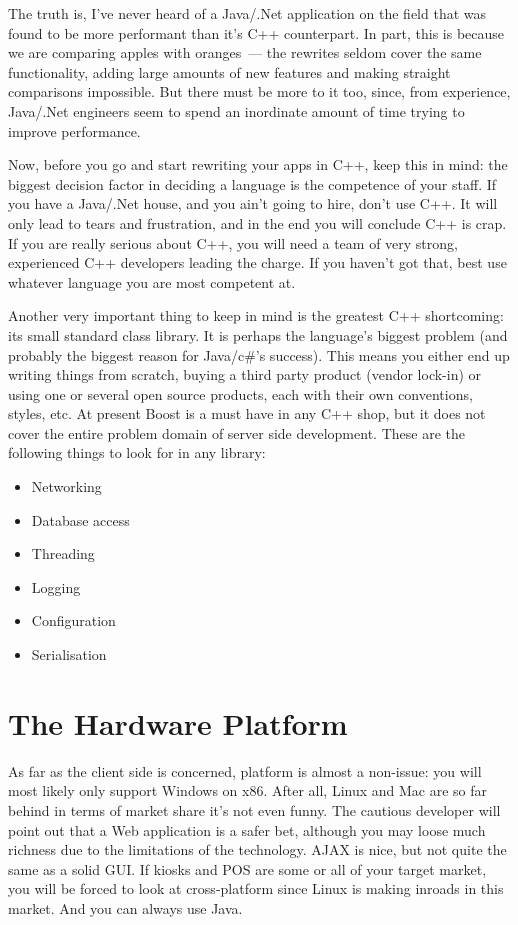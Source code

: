 \documentclass{memoir}
\begin{document}
The truth is, I've never heard of a Java/.Net application on the field
that was found to be more performant than it's C++ counterpart. In
part, this is because we are comparing apples with oranges~--- the
rewrites seldom cover the same functionality, adding large amounts of
new features and making straight comparisons impossible. But there
must be more to it too, since, from experience, Java/.Net engineers
seem to spend an inordinate amount of time trying to improve
performance.

Now, before you go and start rewriting your apps in C++, keep this in
mind: the biggest decision factor in deciding a language is the
competence of your staff. If you have a Java/.Net house, and you ain't
going to hire, don't use C++. It will only lead to tears and
frustration, and in the end you will conclude C++ is crap. If you are
really serious about C++, you will need a team of very strong,
experienced C++ developers leading the charge. If you haven't got
that, best use whatever language you are most competent at.

Another very important thing to keep in mind is the greatest C++
shortcoming: its small standard class library. It is perhaps the
language's biggest problem (and probably the biggest reason for
Java/c\#'s success). This means you either end up writing things from
scratch, buying a third party product (vendor lock-in) or using one or
several open source products, each with their own conventions, styles,
etc. At present Boost is a must have in any C++ shop, but it does not
cover the entire problem domain of server side development. These are
the following things to look for in any library:

\begin{itemize}
\item Networking
\item Database access
\item Threading
\item Logging
\item Configuration
\item Serialisation
\end{itemize}

\section{The Hardware Platform}

As far as the client side is concerned, platform is almost a
non-issue: you will most likely only support Windows on x86. After
all, Linux and Mac are so far behind in terms of market share it's not
even funny. The cautious developer will point out that a Web
application is a safer bet, although you may loose much richness due
to the limitations of the technology. AJAX is nice, but not quite the
same as a solid GUI. If kiosks and POS are some or all of your target
market, you will be forced to look at cross-platform since Linux is
making inroads in this market. And you can always use Java.
\end{document}
